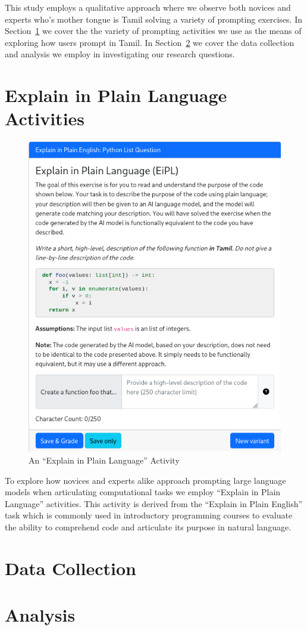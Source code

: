 This study employs a qualitative approach where we observe both novices and
experts who's mother tongue is Tamil solving a variety of prompting exercises.
In Section~\ref{sec:eipl-activities} we cover the the variety of prompting
activities we use as the means of exploring how users prompt in Tamil. In
Section~\ref{sec:data-collection-analysis} we cover the data collection and
analysis we employ in investigating our research questions.

\section{Explain in Plain Language Activities}\label{sec:eipl-activities}

\begin{figure}
    \centering
    \includegraphics[width=0.95\linewidth]{imgs/eipl-tamil.png}
    \caption{An ``Explain in Plain Language'' Activity}
    \label{fig:enter-label}
\end{figure}

To explore how novices and experts alike approach prompting large language
models when articulating computational tasks we employ ``Explain in Plain
Language'' activities. This activity is derived from the ``Explain in Plain
English'' task which is commonly used in introductory programming courses to
evaluate the ability to comprehend code and articulate its purpose in natural
language. 

\section{Data Collection}\label{sec:data-collection-analysis}

\section{Analysis}\label{sec:analysis}